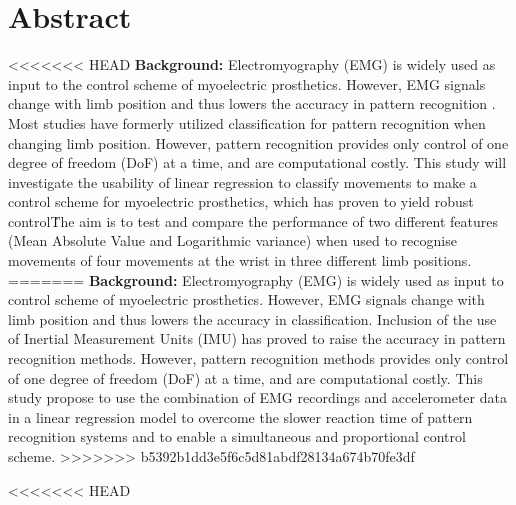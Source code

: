 \section{Abstract}

<<<<<<< HEAD
\textbf{Background:} Electromyography (EMG) is widely used as input to the control scheme of myoelectric prosthetics. However, EMG signals change with limb position and thus lowers the accuracy in pattern recognition \cite{Fougner2010}.%
Most studies have formerly utilized classification for pattern recognition when changing limb position.  
However, pattern recognition provides only control of one degree of freedom (DoF) at a time, and are computational costly. This study will investigate the usability of linear regression to classify movements to make a control scheme for myoelectric prosthetics, which has proven to yield robust control\cite{hahne2014}\. The aim is to test and compare the performance of two different features (Mean Absolute Value and Logarithmic variance) when used to recognise movements of four movements at the wrist in three different limb positions. 
=======
\textbf{Background:} Electromyography (EMG) is widely used as input to control scheme of myoelectric prosthetics. However, EMG signals change with limb position and thus lowers the accuracy in classification.%
Inclusion of the use of Inertial Measurement Units (IMU) has proved to raise the accuracy in pattern recognition methods. However, pattern recognition methods provides only control of one degree of freedom (DoF) at a time, and are computational costly. This study propose to use the combination of EMG recordings and accelerometer data in a linear regression model to overcome the slower reaction time of pattern recognition systems and to enable a simultaneous and proportional control scheme. 
>>>>>>> b5392b1dd3e5f6c5d81abdf28134a674b70fe3df


<<<<<<< HEAD

